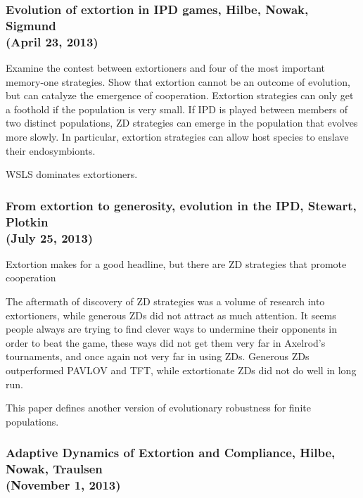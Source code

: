 \subsubsection{Evolution of extortion in IPD games, Hilbe, Nowak, Sigmund \cite{Hilbe23042013}
\\(April 23, 2013)}
Examine the contest between extortioners and four of the most important memory-one strategies. Show that extortion cannot be an outcome of evolution, but can catalyze the emergence of cooperation. Extortion strategies can only get a foothold if the population is very small. If IPD is played between members of two distinct populations, ZD strategies can emerge in the population that evolves more slowly. In particular, extortion strategies can allow host species to enslave their endosymbionts.

WSLS dominates extortioners. 


\subsubsection{From extortion to generosity, evolution in the IPD, Stewart, Plotkin \cite{Stewart03092013}
\\(July 25, 2013)}

Extortion makes for a good headline, but there are ZD strategies that promote cooperation 

The aftermath of discovery of ZD strategies was a volume of research into 
extortioners, while generous ZDs did not attract as much attention. It seems people always are trying to find clever ways to undermine their opponents in order to beat the game, these ways did not get them very far in Axelrod's tournaments, and once again not very far in using ZDs. Generous ZDs outperformed PAVLOV and TFT, while extortionate ZDs did not do well in long run.

This paper defines another version of evolutionary robustness for finite populations.


\subsubsection{Adaptive Dynamics of Extortion and Compliance, Hilbe, Nowak, Traulsen \cite{Hilbe_extortion_compliance}
\\(November 1, 2013)}


